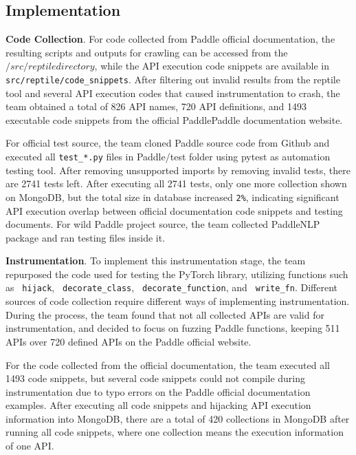 \documentclass[sigconf]{acmart}
\begin{document}
  \subsection{Implementation}
  \textbf{Code Collection}. For code collected from Paddle official documentation, 
  the resulting scripts and outputs for crawling can be accessed from the $/src/reptile directory$, 
  while the API execution code snippets are available in \verb|src/reptile/code_snippets|. 
  After filtering out invalid results from the reptile tool and several API execution codes that caused instrumentation to crash, 
  the team obtained a total of 826 API names, 720 API definitions, and 1493 executable code snippets from the official PaddlePaddle documentation website.
  \par For official test source, the team cloned Paddle source code from Github and executed all \verb|test_*.py| files in Paddle/test folder using pytest as automation testing tool. 
  After removing unsupported imports by removing invalid tests, there are 2741 tests left. After executing all 2741 tests, only one more collection shown on MongoDB, 
  but the total size in database increased  \verb|2%|, indicating significant API execution overlap between official documentation code snippets and testing documents.
  For wild Paddle project source, the team collected PaddleNLP package and ran testing files inside it.

  \textbf{Instrumentation}. To implement this instrumentation stage, the team repurposed the code used for testing the PyTorch library, 
  utilizing functions such as \verb| hijack|, \verb| decorate_class|, \verb| decorate_function|, and \verb| write_fn|. Different sources of code collection require different ways of implementing instrumentation. 
  During the process, the team found that not all collected APIs are valid for instrumentation, and decided to focus on fuzzing Paddle functions, keeping 511 APIs over 720 defined APIs on the Paddle official website.
  
  \par For the code collected from the official documentation, the team executed all 1493 code snippets, but several code snippets could not compile during instrumentation due to typo errors on the Paddle official documentation examples. 
  After executing all code snippets and hijacking API execution information into MongoDB, there are a total of 420 collections in MongoDB after running all code snippets, 
  where one collection means the execution information of one API.
\end{document}
